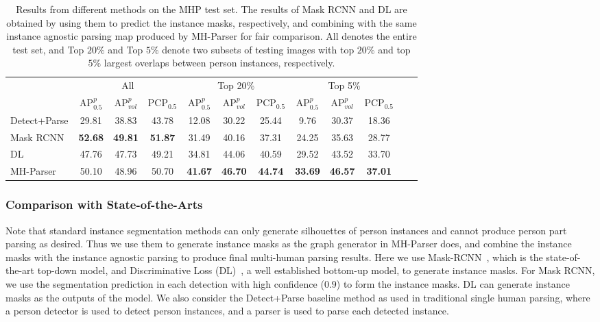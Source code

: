 \documentclass[10pt, letterpaper]{article}
\begin{document}
\begin{table}
  \centering
	\scriptsize
  \caption{Results from different methods on the MHP test set. The results of Mask RCNN and DL are obtained by using them to predict the instance masks, respectively, and combining with the same instance agnostic parsing map produced by MH-Parser for fair comparison. All denotes the entire test set, and Top $20\%$ and Top $5\%$ denote two subsets of testing images with top $20\%$ and top $5\%$ largest overlaps between person instances, respectively.} \label{tab:mhp_test}
  \vspace{4mm}
  \begin{tabular}{lccccccccccc}
    \toprule
\multirow{2}{*}{} & \multicolumn{3}{c}{All}	& \multicolumn{3}{c}{Top 20\%} &  \multicolumn{3}{c}{Top 5\% } \\ 
\cmidrule[\heavyrulewidth](lr){2-4}  \cmidrule[\heavyrulewidth](lr){5-7}\cmidrule[\heavyrulewidth](lr){8-10} 
& AP$^p_{0.5}$  & AP$^p_{vol}$ & PCP$_{0.5}$ &  AP$^p_{0.5}$  & AP$^p_{vol}$ & PCP$_{0.5}$ &  AP$^p_{0.5}$  & AP$^p_{vol}$ & PCP$_{0.5}$ \\
    \midrule
Detect+Parse  &29.81 & 38.83 & 43.78 & 12.08 & 30.22 &25.44 & 9.76 & 30.37 &18.36 \\
Mask RCNN~\cite{he2017mask} & \textbf{52.68} & \textbf{49.81} & \textbf{51.87} & 31.49 & 40.16 & 37.31 & 24.25 &35.63 & 28.77 \\
DL~\cite{de2017semantic} & 47.76 & 47.73 & 49.21  & 34.81 & 44.06 & 40.59 & 29.52 & 43.52 & 33.70 \\
MH-Parser &  50.10 &48.96 & 50.70  & \textbf{41.67} & \textbf{46.70} & \textbf{44.74} & \textbf{33.69} & \textbf{46.57 }& \textbf{37.01} \\
\bottomrule
  \end{tabular}
\end{table}


\subsubsection{Comparison with State-of-the-Arts}
Note that standard instance segmentation methods can only generate silhouettes of person instances and cannot produce person part parsing as desired. Thus we use them to generate instance masks as the graph generator in MH-Parser does, and combine the instance masks with the instance agnostic parsing to produce final multi-human parsing results. Here we use Mask-RCNN~\cite{he2017mask}, which is the state-of-the-art top-down model, and Discriminative Loss (DL)~\cite{de2017semantic}, a well established bottom-up model,  to generate instance masks. For Mask RCNN, we use the segmentation prediction in each detection with high confidence ($0.9$) to form the instance masks. DL can generate instance masks as the outputs of the model.  We also consider the Detect+Parse baseline method as used in traditional single human parsing, where a person detector is used to detect person instances, and a parser is used to parse each detected instance.
\end{document}
